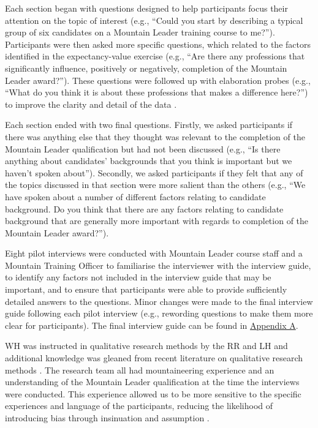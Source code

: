 \documentclass[
  12pt,
  a4paper,
]{book}
\begin{document}
Each section began with questions designed to help participants focus their attention on the topic of interest (e.g., ``Could you start by describing a typical group of six candidates on a Mountain Leader training course to me?''). Participants were then asked more specific questions, which related to the factors identified in the expectancy-value exercise (e.g., ``Are there any professions that significantly influence, positively or negatively, completion of the Mountain Leader award?''). These questions were followed up with elaboration probes (e.g., ``What do you think it is about these professions that makes a difference here?'') to improve the clarity and detail of the data \citep{Patton2002}.

Each section ended with two final questions. Firstly, we asked participants if there was anything else that they thought was relevant to the completion of the Mountain Leader qualification but had not been discussed (e.g., ``Is there anything about candidates' backgrounds that you think is important but we haven't spoken about''). Secondly, we asked participants if they felt that any of the topics discussed in that section were more salient than the others (e.g., ``We have spoken about a number of different factors relating to candidate background. Do you think that there are any factors relating to candidate background that are generally more important with regards to completion of the Mountain Leader award?'').

Eight pilot interviews were conducted with Mountain Leader course staff and a Mountain Training Officer to familiarise the interviewer with the interview guide, to identify any factors not included in the interview guide that may be important, and to ensure that participants were able to provide sufficiently detailed answers to the questions. Minor changes were made to the final interview guide following each pilot interview (e.g., rewording questions to make them more clear for participants). The final interview guide can be found in \protect\hyperlink{appendix-interview-guide}{Appendix A}.

WH was instructed in qualitative research methods by the RR and LH and additional knowledge was gleaned from recent literature on qualitative research methods \citep[e.g.,][]{Smith2018a}. The research team all had mountaineering experience and an understanding of the Mountain Leader qualification at the time the interviews were conducted. This experience allowed us to be more sensitive to the specific experiences and language of the participants, reducing the likelihood of introducing bias through insinuation and assumption \citep{Denzin2005}.
\end{document}
